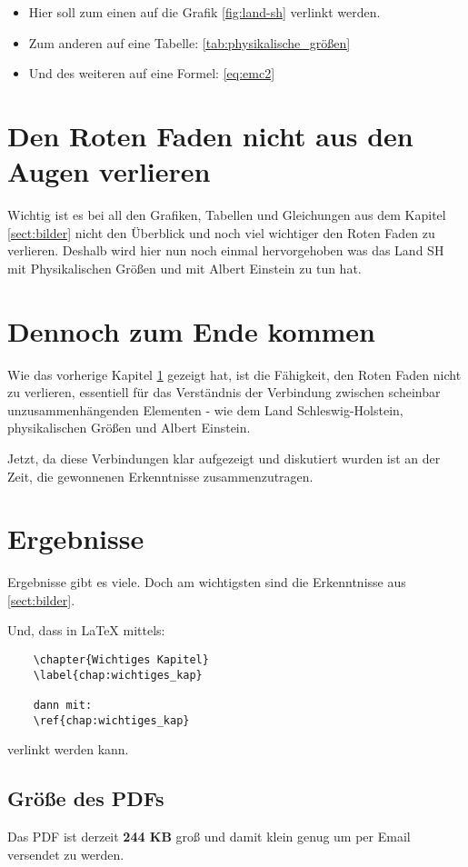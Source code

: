 \newpage

\begin{itemize}
	\item Hier soll zum einen auf die Grafik \cref{fig:land-sh} verlinkt werden.
	\item Zum anderen auf eine Tabelle: \cref{tab:physikalische_größen}
	\item Und des weiteren auf eine Formel: \cref{eq:emc2}
\end{itemize}



\chapter{Den Roten Faden nicht aus den Augen verlieren}
\label{chapt:roterFaden}

Wichtig ist es bei all den Grafiken, Tabellen und Gleichungen aus dem Kapitel \ref{sect:bilder} nicht den Überblick und noch viel wichtiger den Roten Faden zu verlieren. Deshalb wird hier nun noch einmal hervorgehoben was das Land SH mit Physikalischen Größen und mit Albert Einstein zu tun hat. 


\chapter{Dennoch zum Ende kommen}
\label{chap:zumEndeKommen}

Wie das vorherige Kapitel \ref{chapt:roterFaden} gezeigt hat, ist die Fähigkeit, den Roten Faden nicht zu verlieren, essentiell für das Verständnis der Verbindung zwischen scheinbar unzusammenhängenden Elementen - wie dem Land Schleswig-Holstein, physikalischen Größen und Albert Einstein. 


Jetzt, da diese Verbindungen klar aufgezeigt und diskutiert wurden ist an der Zeit, die gewonnenen Erkenntnisse zusammenzutragen.


\chapter{Ergebnisse}
\label{chap:ergebnisse}

Ergebnisse gibt es viele. Doch am wichtigsten sind die Erkenntnisse aus \ref{sect:bilder}. 

Und, dass in \LaTeX{} mittels:

\begin{verbatim}
	\chapter{Wichtiges Kapitel}
	\label{chap:wichtiges_kap}
	
	dann mit:
	\ref{chap:wichtiges_kap}
\end{verbatim}

verlinkt werden kann.

\section{Größe des PDFs}

Das PDF ist derzeit \textbf{244 KB} groß und damit klein genug um per Email versendet zu werden.

